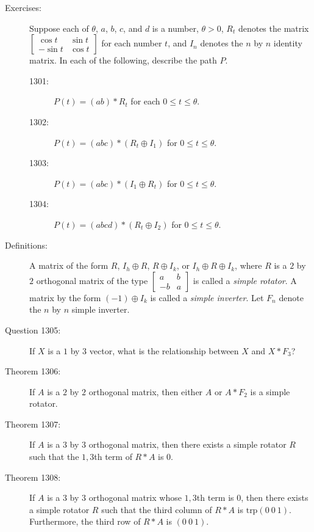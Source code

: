 \documentclass{article}
\begin{document}
\begin{description}

  \item[Exercises:] Suppose each of $\theta$, $a$, $b$, $c$, and $d$ is a number, $\theta > 0$, $R_{t}$ denotes the matrix $ 
    \begin{bmatrix}
       \cos t & \sin t \\
      -\sin t & \cos t
    \end{bmatrix} 
    $ for each number $t$, and $I_{n}$ denotes the $n$ by $n$ identity matrix. In each of the following, describe the path $P$.
    \begin{description}
      \item[1301:] $P(t) = (a b)*R_{t}$ for each $0 \leq t \leq \theta$.
      \item[1302:] $P(t)=(a b c)*(R_{t} \oplus I_{1})$ for $0 \leq t \leq \theta$.
      \item[1303:] $P(t)=(a b c)*(I_{1} \oplus R_{t})$ for $0 \leq t \leq \theta$.
      \item[1304:] $P(t)=(a b c d)*(R_{t} \oplus I_{2})$ for $0 \leq t \leq \theta$.
    \end{description}

  \item[Definitions:] A matrix of the form $R$, $I_{h} \oplus R$, $R \oplus I_{k}$, or $I_{h} \oplus R \oplus I_{k}$, where $R$ is a $2$ by $2$ orthogonal matrix of the type $
    \begin{bmatrix}
       a & b \\ 
      -b & a
    \end{bmatrix} 
    $ is called a \emph{simple rotator}. A matrix by the form $(-1) \oplus  I_{k}$ is called a \emph{simple inverter}. Let $F_{n}$ denote the $n$ by $n$ simple inverter.

  \item[Question 1305:] If $X$ is a $1$ by $3$ vector, what is the relationship between $X$ and $X*F_{3}$?

  \item[Theorem 1306:] If $A$ is a $2$ by $2$ orthogonal matrix, then either $A$ or $A*F_{2}$ is a simple rotator.

  \item[Theorem 1307:] If $A$ is a $3$ by $3$ orthogonal matrix, then there exists a simple rotator $R$ such that the $1,3$th term of $R*A$ is $0$.

  \item[Theorem 1308:] If $A$ is a $3$ by $3$ orthogonal matrix whose $1,3$th term is $0$, then there exists a simple rotator $R$ such that the third column of $R*A$ is $\text{trp} (0\ 0\ 1)$. Furthermore, the third row of $R*A$ is $(0\ 0\ 1)$.


\end{description}
\end{document}
